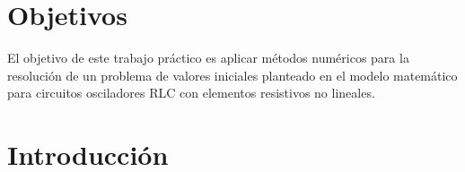 \documentclass[a4paper, 10pt, spanish]{article}
\begin{document}
%
%
\setcounter{page}{1}

%
%
\tableofcontents
\newpage

%
%
\section{Objetivos}
El objetivo de este trabajo práctico es aplicar métodos numéricos para la resolución de un problema de valores iniciales planteado en el modelo matemático para circuitos osciladores RLC con elementos resistivos no lineales.

\section{Introducción}
\end{document}
